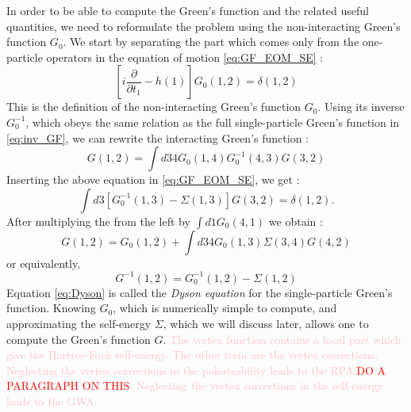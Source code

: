 In order to be able to compute the Green's function and the related useful quantities, we need to reformulate the problem using the non-interacting Green's function $G_0$. We start by separating the part which comes only from the one-particle operators in the equation of motion \eqref{eq:GF_EOM_SE} :
\begin{equation}
	\left[ i\frac{\partial}{\partial t_1} - h(1) \right] G_0(1,2) = \delta(1,2)
\end{equation}
This is the definition of the non-interacting Green's function $G_0$. Using its inverse $G_0^{-1}$, which obeys the same relation as the full single-particle Green's function in \eqref{eq:inv_GF}, we can rewrite the interacting Green's function :
\begin{equation}
	G(1,2) = \int d34 G_0(1,4)G^{-1}_0(4,3)G(3,2)
\end{equation}
Inserting the above equation in \eqref{eq:GF_EOM_SE}, we get :
\begin{equation}
	\int d3 \left[ G_0^{-1}(1,3) - \Sigma(1,3) \right] G(3,2) = \delta(1,2).
\end{equation}
After multiplying the from the left by $\int d1 G_0(4,1)$ we obtain :
\begin{equation}
	G(1,2) = G_0(1,2) + \int d34 G_0(1,3) \Sigma(3,4) G(4,2) \label{eq:Dyson}
\end{equation}
or equivalently,
\begin{equation}
	G^{-1}(1,2) = G_0^{-1}(1,2) - \Sigma(1,2)
\end{equation}
Equation \eqref{eq:Dyson} is called the \textit{Dyson equation} for the single-particle Green's function. Knowing $G_0$, which is numerically simple to compute, and approximating the self-energy $\Sigma$, which we will discuss later, allows one to compute the Green's function $G$.
\textcolor{pink}{The vertex function contains a local part which give the Hartree-Fock self-energy. The other term are the vertex corrections. Neglecting the vertex corrections in the polarizability leads to the RPA.\textcolor{red}{DO A PARAGRAPH ON THIS}. Neglecting the vertex corrections in the self-energy leads to the GWA.}

